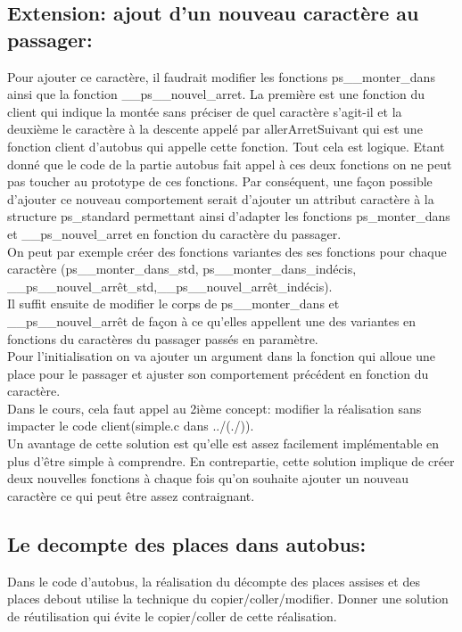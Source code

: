 \documentclass{article}
\begin{document}
\subsection{Extension: ajout d'un nouveau caractère au passager:}
Pour ajouter ce caractère, il faudrait modifier les fonctions ps\_\_monter\_dans ainsi que
la fonction \_\_ps\_\_nouvel\_arret. La première est une fonction du client qui indique la montée sans préciser de quel caractère s'agit-il et la deuxième le caractère à la descente appelé par allerArretSuivant qui est une fonction client d'autobus qui appelle cette fonction. Tout cela est logique.
\newline
Etant donné que le code de la partie autobus fait appel à ces deux fonctions on ne peut
pas toucher au prototype de ces fonctions. Par conséquent, une façon possible d’ajouter ce
nouveau comportement serait d’ajouter un attribut caractère à la structure ps\_standard
permettant ainsi d’adapter les fonctions ps\_monter\_dans et \_\_ps\_nouvel\_arret en fonction du caractère du passager. \\
On peut par exemple créer des fonctions variantes des ses fonctions pour chaque
caractère (ps\_\_monter\_dans\_std, ps\_\_monter\_dans\_indécis,\\ \_\_ps\_\_nouvel\_arrêt\_std,\_\_ps\_\_nouvel\_arrêt\_indécis). \\ Il suffit ensuite de modifier le corps de ps\_\_monter\_dans et \_\_ps\_\_nouvel\_arrêt de façon à ce qu’elles appellent une des variantes en fonctions du caractères du passager passés en paramètre.
\\
Pour l'initialisation on va ajouter un argument dans la fonction qui alloue une place pour le passager et ajuster son comportement précédent en fonction du caractère.\\
Dans le cours, cela faut appel au 2ième concept: modifier la réalisation sans impacter le code client(simple.c dans ../(./)).\\
Un avantage de cette solution est qu’elle est assez facilement implémentable en plus
d’être simple à comprendre. En contrepartie, cette solution implique de créer deux nouvelles fonctions à chaque fois qu’on souhaite ajouter un nouveau caractère ce qui peut être assez contraignant.\\
\newline
\subsection{Le decompte des places dans autobus:}
Dans le code d’autobus, la réalisation du décompte des places assises et des places
debout utilise la technique du copier/coller/modifier.
Donner une solution de réutilisation qui évite le copier/coller de cette réalisation.
\end{document}
